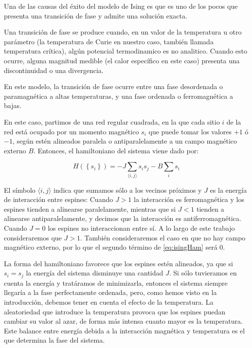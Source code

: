 \documentclass[11pt, a4paper]{article} %
\theoremstyle{named}
\begin{document}
Una de las causas del éxito del modelo de Ising es que es uno de los pocos que presenta una transición de fase y admite una solución exacta.

Una transición de fase se produce cuando, en un valor de la temperatura u otro parámetro (la temperatura de Curie en nuestro caso, también llamada temperatura crítica), algún potencial termodinamico es no analitico. Cuando esto ocurre, alguna magnitud medible (el calor específico en este caso) presenta una discontinuidad o una divergencia.

En este modelo, la transición de fase ocurre entre una fase desordenada o paramagnética a altas temperaturas, y una fase ordenada o ferromagnética a bajas.

En este caso, partimos de una red regular cuadrada, en la que cada sitio $i$ de la red está ocupado por un momento magnético $s_i$ que puede tomar los valores $+1$ ó $-1$, según estén alineados paralela o antiparalelamente a un campo magnético externo $B$. Entonces, el hamiltoniano del sistema viene dado por:

\begin{equation}\label{eq:isingHam}
H\left(\left\{s_{i}\right\}\right)=-J \sum_{\langle i, j\rangle} s_{i} s_{j} - B \sum_i s_i
\end{equation}

El símbolo $\langle i, j\rangle$ indica que sumamos sólo a los vecinos próximos y $J$ es la energía de interacción entre espines: Cuando $J > 1$ la interacción es ferromagnética y los espines tienden a alinearse paralelamente, mientras que si $J<1$ tienden a alinearse antiparalelamente, y decimos que la interacción es antiferromagnética. Cuando $J=0$ los espines no interaccionan entre sí. A lo largo de este trabajo consideraremos que $J>1$. También consideraremos el caso en que no hay campo magnético externo, por lo que el segundo término de \eqref{eq:isingHam} será $0$.

La forma del hamiltoniano favorece que los espines estén alineados, ya que si $s_i = s_j$ la energía del sistema disminuye una cantidad $J$. Si sólo tuvieramos en cuenta la energía y tratáramos de minimizarla, entonces el sistema siempre llegaría a la fase perfectamente ordenada, pero, como hemos visto en la introducción, debemos tener en cuenta el efecto de la temperatura. La aleatoriedad que introduce la temperatura provoca que los espines puedan cambiar su valor al azar, de forma más intensa cuanto mayor es la temperatura. Este balance entre energía debida a la interacción magnética y temperatura es el que determina la fase del sistema.
\end{document}
